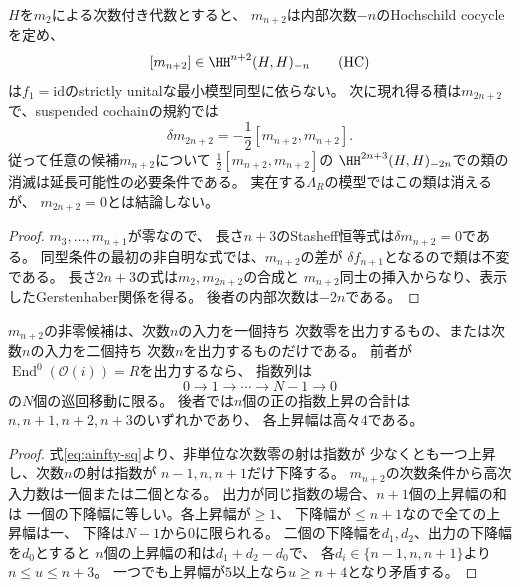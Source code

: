 \begin{proposition}[最初のHochschild類と次の二次障害]
\label{prop:ainfty-hoch}
$H$を$m_2$による次数付き代数とすると、
$m_{n+2}$は内部次数$-n$のHochschild cocycleを定め、
\[
 [m_{n+2}]\in\HH^{n+2}(H,H)_{-n}
 \tag{HC}\label{eq:ainfty-hh}
\]
は$f_1=\mathrm{id}$のstrictly unitalな最小模型同型に依らない。
次に現れ得る積は$m_{2n+2}$で、suspended cochainの規約では
\[
 \delta m_{2n+2}
   =-\frac12[m_{n+2},m_{n+2}].
 \tag{OB}\label{eq:ainfty-ob}
\]
従って任意の候補$m_{n+2}$について
$\frac12[m_{n+2},m_{n+2}]$の
$\HH^{2n+3}(H,H)_{-2n}$での類の消滅は延長可能性の必要条件である。
実在する$\Lambda_R$の模型ではこの類は消えるが、
$m_{2n+2}=0$とは結論しない。
\end{proposition}
\begin{proof}
$m_3,\ldots,m_{n+1}$が零なので、
長さ$n+3$のStasheff恒等式は$\delta m_{n+2}=0$である。
同型条件の最初の非自明な式では、$m_{n+2}$の差が
$\delta f_{n+1}$となるので類は不変である。
長さ$2n+3$の式は$m_2,m_{2n+2}$の合成と
$m_{n+2}$同士の挿入からなり、表示したGerstenhaber関係を得る。
後者の内部次数は$-2n$である。
\end{proof}

\begin{proposition}[最初の高次積の対象指数制限]
\label{prop:ainfty-indices}
$m_{n+2}$の非零候補は、次数$n$の入力を一個持ち
次数零を出力するもの、または次数$n$の入力を二個持ち
次数$n$を出力するものだけである。
前者が$\operatorname{End}^0(\mathcal O(i))=R$を出力するなら、
指数列は
\[
0\to1\to\cdots\to N-1\to0
\tag{CY}\label{eq:ainfty-cyclic}
\]
の$N$個の巡回移動に限る。
後者では$n$個の正の指数上昇の合計は
$n,n+1,n+2,n+3$のいずれかであり、
各上昇幅は高々$4$である。
\end{proposition}
\begin{proof}
式\eqref{eq:ainfty-sq}より、非単位な次数零の射は指数が
少なくとも一つ上昇し、次数$n$の射は指数が
$n-1,n,n+1$だけ下降する。
$m_{n+2}$の次数条件から高次入力数は一個または二個となる。
出力が同じ指数の場合、$n+1$個の上昇幅の和は
一個の下降幅に等しい。各上昇幅が$\ge1$、
下降幅が$\le n+1$なので全ての上昇幅は一、
下降は$N-1$から$0$に限られる。
二個の下降幅を$d_1,d_2$、出力の下降幅を$d_0$とすると
$n$個の上昇幅の和は$d_1+d_2-d_0$で、
各$d_i\in\{n-1,n,n+1\}$より$n\le u\le n+3$。
一つでも上昇幅が$5$以上なら$u\ge n+4$となり矛盾する。
\end{proof}

